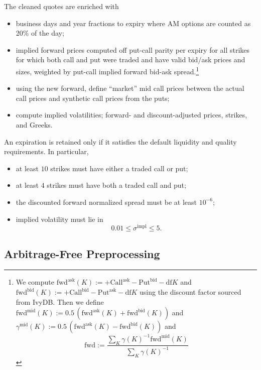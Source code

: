 \documentclass[11pt,a4paper]{article}
\begin{document}
The cleaned quotes are enriched with
%
\begin{itemize}
    \item business days and year fractions to expiry where AM options are counted as 20\% of
    the day;
    \item implied forward prices computed off put-call parity per expiry for all strikes
          for which both call and put were traded and have valid bid/ask prices and sizes, weighted by put-call implied forward bid-ask spread.\footnote{
            We compute
            $\mathrm{fwd}^\mathrm{ask}(K):=+\mathrm{Call}^\mathrm{ask}-\mathrm{Put}^\mathrm{bid}-\mathrm{df} K$ and
            $\mathrm{fwd}^\mathrm{bid}(K):=+\mathrm{Call}^\mathrm{bid}-\mathrm{Put}^\mathrm{ask}-\mathrm{df} K$ using the discount factor sourced from IvyDB. 
            Then we
            define $\mathrm{fwd}^\mathrm{mid}(K) := 0.5\,(\mathrm{fwd}^\mathrm{ask}(K) + \mathrm{fwd}^\mathrm{bid}(K))$ and $\gamma^\mathrm{mid}(K) := 0.5\,(\mathrm{fwd}^\mathrm{ask}(K) - \mathrm{fwd}^\mathrm{bid}(K))$ and
            $$
                \mathrm{fwd} :=\frac{ \sum_K \gamma(K)^{-1} \mathrm{fwd}^\mathrm{mid}(K) }
                 { \sum_K \gamma(K)^{-1} }
            $$
          }
    \item using the new forward, define ``market'' mid call prices between the actual call
    prices and synthetic call prices from the puts;
    \item compute implied volatilities; forward- and discount-adjusted prices, strikes, and Greeks.
\end{itemize}
An expiration is retained only if it satisfies the default liquidity and quality requirements. In particular,
%
\begin{itemize}
    \item at least \(10\) strikes must have either a traded call or put;
    \item at least \(4\) strikes must have both a traded call and put;
    \item the discounted forward normalized spread must be at least \(10^{-6}\);
    \item implied volatility must lie in
    \[
        0.01 \leq \sigma^{\mathrm{impl}} \leq 5.
    \]
\end{itemize}

\subsection{Arbitrage-Free Preprocessing}
\end{document}
